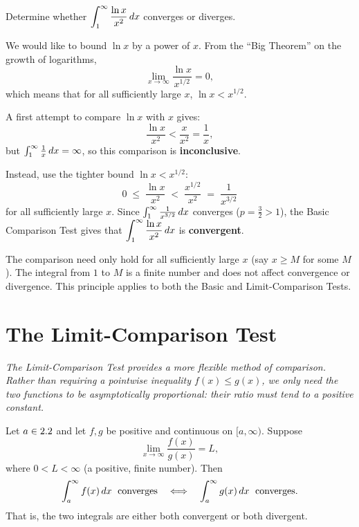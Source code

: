 \begin{example}
\label{ex:12-11}
Determine whether $\displaystyle\int_{1}^{\infty}\frac{\ln x}{x^{2}}\,dx$ converges or diverges.

We would like to bound $\ln x$ by a power of $x$.  From the ``Big Theorem'' on the growth of logarithms,
\[
  \lim_{x\to\infty}\frac{\ln x}{x^{1/2}} = 0,
\]
which means that for all sufficiently large $x$, $\ln x < x^{1/2}$.

A first attempt to compare $\ln x$ with $x$ gives:
\[
  \frac{\ln x}{x^{2}} < \frac{x}{x^{2}} = \frac{1}{x},
\]
but $\int_{1}^{\infty}\frac{1}{x}\,dx = \infty$, so this comparison is \textbf{inconclusive}.

Instead, use the tighter bound $\ln x < x^{1/2}$:
\[
  0 \;\le\; \frac{\ln x}{x^{2}} \;<\; \frac{x^{1/2}}{x^{2}} \;=\; \frac{1}{x^{3/2}}
\]
for all sufficiently large $x$.  Since $\int_{1}^{\infty}\frac{1}{x^{3/2}}\,dx$ converges ($p=\frac{3}{2}>1$), the Basic Comparison Test gives that $\displaystyle\int_{1}^{\infty}\frac{\ln x}{x^{2}}\,dx$ is \textbf{convergent}.
\end{example}

\begin{remark}
The comparison need only hold for all sufficiently large $x$ (say $x\ge M$ for some $M$).  The integral from $1$ to $M$ is a finite number and does not affect convergence or divergence.  This principle applies to both the Basic and Limit-Comparison Tests.
\end{remark}

\section{The Limit-Comparison Test}
\label{sec:12.9}

\textit{The Limit-Comparison Test provides a more flexible method of comparison.  Rather than requiring a pointwise inequality $f(x)\le g(x)$, we only need the two functions to be \emph{asymptotically proportional}: their ratio must tend to a positive constant.}

\begin{theorem}
\label{thm:12-4}
Let $a\in2.2$ and let $f,g$ be positive and continuous on $[a,\infty)$.  Suppose
\[
  \lim_{x\to\infty}\frac{f(x)}{g(x)} = L,
\]
where $0<L<\infty$ (a positive, finite number).  Then
\[
  \int_{a}^{\infty}f(x)\,dx \;\text{ converges}
  \quad\Longleftrightarrow\quad
  \int_{a}^{\infty}g(x)\,dx \;\text{ converges.}
\]
That is, the two integrals are either both convergent or both divergent.
\end{theorem}

